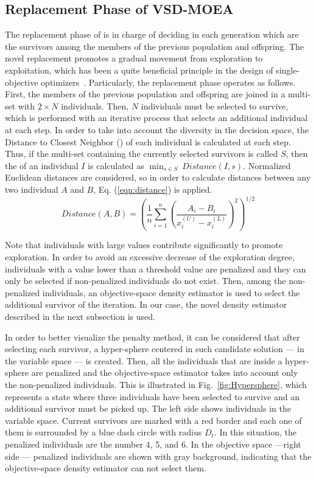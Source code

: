 \subsection{Replacement Phase of VSD-MOEA}

The replacement phase of \EAS{} is in charge of deciding in each generation which are the survivors 
among the members of the previous population and offspring.
%
The novel replacement promotes a gradual movement from exploration to exploitation, which has been a quite 
beneficial principle in the design of single-objective optimizers~\cite{Joel:MULTI_DYNAMIC}.
%
Particularly, the replacement phase operates as follows.
%
First, the members of the previous population and offspring are joined in a multi-set with $2 \times N$ individuals.
%
Then, $N$ individuals must be selected to survive, which is performed with an iterative process that selects an additional
individual at each step.
%
In order to take into account the diversity in the decision space, the Distance to Closest Neighbor (\DCN{}) of each
individual is calculated at each step.
%
Thus, if the multi-set containing the currently selected survivors is called $S$, then the \DCN{} of an individual $I$ is calculated
as $\displaystyle{\min_{s \in S}\ Distance(I, s)}$.
%
Normalized Euclidean distances are considered, so in order to calculate distances between any two individual $A$ and $B$, 
Eq. (\ref{eqn:distance}) is applied.
%
\begin{equation}\label{eqn:distance}
Distance(A, B) =   \left ( \frac{1}{n}  \sum_{i=1}^n \left ( \frac{A_i - B_i}{x_i^{(U)} - x_i^{(L)}} \right )^2  \right)^{1/2}
\end{equation}

Note that individuals with large \DCN{} values contribute significantly to promote exploration.
%
In order to avoid an excessive decrease of the exploration degree, individuals with a \DCN{} value lower 
than a threshold value are penalized and they can only be selected if non-penalized individuals do not exist.
%
Then, among the non-penalized individuals, an objective-space density estimator is used to select the additional
survivor of the iteration.
%
In our case, the novel density estimator described in the next subsection is used. 

In order to better visualize the penalty method, it can be considered that after selecting each survivor, a hyper-sphere 
centered in such candidate solution --- in the variable space --- is created.
%
Then, all the individuals that are inside a hyper-sphere are penalized and the objective-space estimator takes 
into account only the non-penalized individuals.
%
This is illustrated in Fig.~\ref{fig:Hypersphere}, which represents a state where three individuals have been 
selected to survive and an additional survivor must be picked up.
%
The left side shows individuals in the variable space.
%
Current survivors are marked with a red border and each one of them is surrounded by a blue dash circle with 
radius $D_t$.
%
In this situation, the penalized individuals are the number 4, 5, and 6.
%
In the objective space ---right side --- penalized individuals are shown with gray background, indicating
that the objective-space density estimator can not select them.

